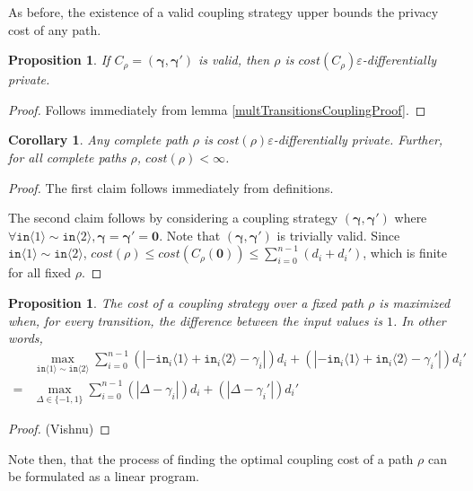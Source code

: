 \documentclass[12pt]{article}
\newcommand{\brangle}[1]{\langle #1 \rangle}
\newtheorem{prop}[thm]{Proposition}
\newtheorem{cor}[thm]{Corollary}
\theoremstyle{definition}
\begin{document}
As before, the existence of a valid coupling strategy upper bounds the privacy cost of any path. 

\begin{prop}
    If $C_\rho=(\bm{\gamma}, \bm{\gamma}')$ is valid, then $\rho$ is $cost(C_\rho)\varepsilon$-differentially private.
\end{prop}

\begin{proof}
    Follows immediately from lemma \ref{multTransitionsCouplingProof}.
\end{proof}

\begin{cor}
    Any complete path $\rho$ is $cost(\rho)\varepsilon$-differentially private. Further, for all complete paths $\rho$, $cost(\rho)<\infty$. 
\end{cor}

\begin{proof}
    The first claim follows immediately from definitions. 
    
    The second claim follows by considering a coupling strategy $(\bm{\gamma}, \bm{\gamma}')$ where $\forall \texttt{in}\brangle{1}\sim\texttt{in}\brangle{2}, \bm{\gamma} = \bm{\gamma}' = \bm{0}$. Note that $(\bm{\gamma}, \bm{\gamma}')$ is trivially valid. Since $\texttt{in}\brangle{1}\sim\texttt{in}\brangle{2}$, $cost(\rho)\leq cost(C_\rho(\bm{0}))\leq \sum_{i=0}^{n-1}(d_i+d_i')$, which is finite for all fixed $\rho$. 
\end{proof}


\begin{prop}
    The cost of a coupling strategy over a fixed path $\rho$ is maximized when, for every transition, the difference between the input values is $1$. In other words,
    \begin{align*}
        &\max_{\texttt{in}\brangle{1}\sim \texttt{in}\brangle{2}} \sum_{i=0}^{n-1}(|-\texttt{in}_i\brangle{1}+\texttt{in}_i\brangle{2}-\gamma_i|)d_i+(|-\texttt{in}_i\brangle{1}+\texttt{in}_i\brangle{2}-\gamma_i'|)d_i' \\
        = &\max_{\Delta\in \{-1, 1\}} \sum_{i=0}^{n-1}(|\Delta-\gamma_i|)d_i+(|\Delta-\gamma_i'|)d_i'
    \end{align*}
\end{prop}
\begin{proof}
    (Vishnu)
\end{proof}

Note then, that the process of finding the optimal coupling cost of a path $\rho$ can be formulated as a linear program.
 
\end{document}
